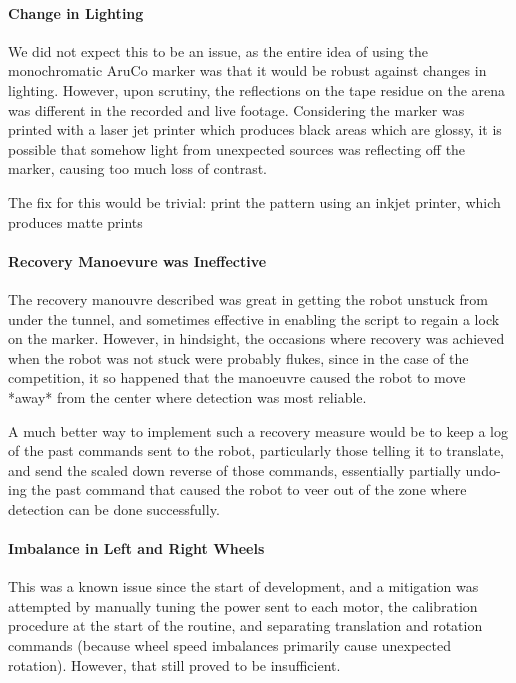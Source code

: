 \documentclass{article}
\begin{document}
\paragraph{Change in Lighting}
We did not expect this to be an issue, as the entire idea of using the monochromatic AruCo marker was that it would be robust against changes in lighting. However, upon scrutiny, the reflections on the tape residue on the arena was different in the recorded and live footage. Considering the marker was printed with a laser jet printer which produces black areas which are glossy, it is possible that somehow light from unexpected sources was reflecting off the marker, causing too much loss of contrast.

The fix for this would be trivial: print the pattern using an inkjet printer, which produces matte prints

\paragraph{Recovery Manoevure was Ineffective}

The recovery manouvre described was great in getting the robot unstuck from under the tunnel, and sometimes effective in enabling the script to regain a lock on the marker. However, in hindsight, the occasions where recovery was achieved when the robot was not stuck were probably flukes, since in the case of the competition, it so happened that the manoeuvre caused the robot to move *away* from the center where detection was most reliable.

A much better way to implement such a recovery measure would be to keep a log of the past commands sent to the robot, particularly those telling it to translate, and send the scaled down reverse of those commands, essentially partially undo-ing the past command that caused the robot to veer out of the zone where detection can be done successfully.

\paragraph{Imbalance in Left and Right Wheels}
This was a known issue since the start of development, and a mitigation was attempted by manually tuning the power sent to each motor, the calibration procedure at the start of the routine, and separating translation and rotation commands (because wheel speed imbalances primarily cause unexpected rotation). However, that still proved to be insufficient.
\end{document}
